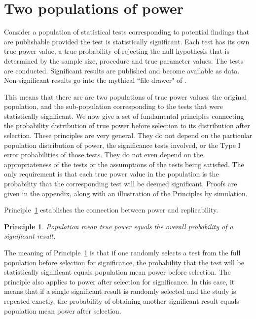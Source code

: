 \documentclass[jou]{apa6} %
\newtheorem{princ}{Principle}
\begin{document}

\section{Two populations of power}

Consider a population of statistical tests corresponding to potential findings that are publishable provided the test is statistically significant. Each test has its own true power value, a true probability of rejecting the null hypothesis that is determined by the sample size, procedure and true parameter values. The tests are conducted. Significant results are published and become available as data. Non-significant results go into the mythical ``file drawer" of \textcite{Rosenthal1979}. 

This means that there are are two populations of true power values: the original population, and the sub-population corresponding to the tests that were statistically significant. We now give a set of fundamental principles connecting the probability distribution of true power before selection to its distribution after selection. These principles are very general. They do not depend on the particular population distribution of power, the significance tests involved, or the Type I error probabilities of those tests. They do not even depend on the appropriateness of the tests or the assumptions of the tests being satisfied. The only requirement is that each true power value in the population is the probability that the corresponding test will be deemed significant. Proofs are given in the appendix, along with an illustration of the Principles by simulation.

Principle~\ref{doubleex} establishes the connection between power and replicability.

\begin{princ} \label{doubleex}
Population mean true power equals the overall probability of a significant result.
\end{princ}
The meaning of Principle~\ref{doubleex} is that if one randomly selects a test from the full population before selection for significance, the probability that the test will be statistically significant equals population mean power before selection. The principle also applies to power after selection for significance. In this case, it means that if a single significant result is randomly selected and the study is repeated exactly, the probability of obtaining another significant result equals population mean power after selection. 
\end{document}
